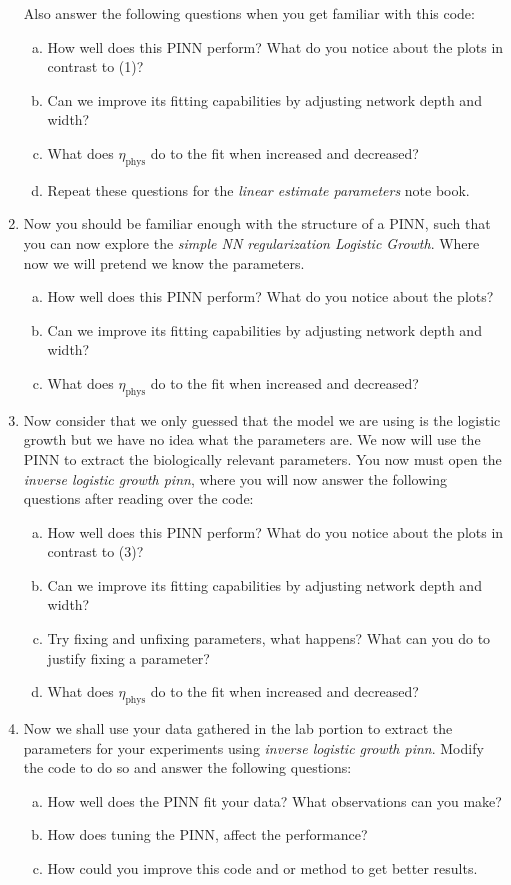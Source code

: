\documentclass{exam}
\begin{document}
\begin{enumerate}[(1)]
    Also answer the following questions when you get familiar with this code:
    \begin{enumerate}[(a)]
        \item How well does this PINN perform? What do you notice about the plots in contrast to (1)?  
        \item Can we improve its fitting capabilities by adjusting network depth and width?
        \item What does \(\eta_{\text{phys}}\) do to the fit when increased and decreased?
        \item Repeat these questions for the \emph{linear estimate parameters} note book.
    \end{enumerate}
    \item Now you should be familiar enough with the structure of a PINN, such that you can now explore the \emph{simple NN regularization Logistic Growth}. Where now we will pretend we know the parameters. 
    \begin{enumerate}[(a)]
        \item How well does this PINN perform? What do you notice about the plots?  
        \item Can we improve its fitting capabilities by adjusting network depth and width?
        \item What does \(\eta_{\text{phys}}\) do to the fit when increased and decreased?
    \end{enumerate}
    \item Now consider that we only guessed that the model we are using is the logistic growth but we have no idea what the parameters are. We now will use the PINN to extract the biologically relevant parameters. You now must open the \emph{inverse logistic growth pinn}, where you will now answer the following questions after reading over the code:
     \begin{enumerate}[(a)]
        \item How well does this PINN perform? What do you notice about the plots in contrast to (3)?  
        \item Can we improve its fitting capabilities by adjusting network depth and width? 
        \item Try fixing and unfixing parameters, what happens? What can you do to justify fixing a parameter?
        \item What does \(\eta_{\text{phys}}\) do to the fit when increased and decreased?
    \end{enumerate}
    \item Now we shall use your data gathered in the lab portion to extract the parameters for your experiments using \emph{inverse logistic growth pinn}. Modify the code to do so and answer the following questions:
    \begin{enumerate}[(a)]
        \item How well does the PINN fit your data? What observations can you make?
        \item How does tuning the PINN, affect the performance? 
        \item How could you improve this code and or method to get better results.
    \end{enumerate}
\end{enumerate}
\end{document}
